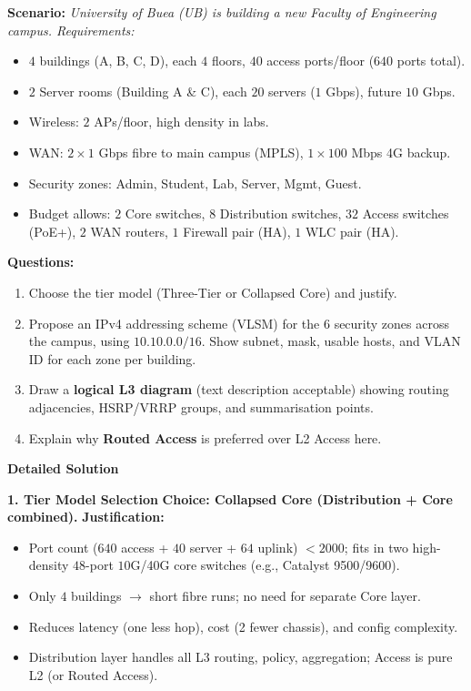 \documentclass[11pt]{article}
\begin{document}
\begin{exoresolu}
\textbf{Scenario:} \textit{University of Buea (UB) is building a new Faculty of Engineering campus. Requirements:}
\begin{itemize}
    \item $4$ buildings (A, B, C, D), each $4$ floors, $40$ access ports/floor ($640$ ports total).
    \item $2$ Server rooms (Building A \& C), each $20$ servers ($1$ Gbps), future $10$ Gbps.
    \item Wireless: $2$ APs/floor, high density in labs.
    \item WAN: $2 \times 1$ Gbps fibre to main campus (MPLS), $1 \times 100$ Mbps 4G backup.
    \item Security zones: Admin, Student, Lab, Server, Mgmt, Guest.
    \item Budget allows: $2$ Core switches, $8$ Distribution switches, $32$ Access switches (PoE+), $2$ WAN routers, $1$ Firewall pair (HA), $1$ WLC pair (HA).
\end{itemize}

\textbf{Questions:}
\begin{enumerate}
    \item Choose the tier model (Three-Tier or Collapsed Core) and justify.
    \item Propose an IPv4 addressing scheme (VLSM) for the $6$ security zones across the campus, using $10.10.0.0/16$. Show subnet, mask, usable hosts, and VLAN ID for each zone per building.
    \item Draw a \textbf{logical L3 diagram} (text description acceptable) showing routing adjacencies, HSRP/VRRP groups, and summarisation points.
    \item Explain why \textbf{Routed Access} is preferred over L2 Access here.
\end{enumerate}
\tcblower
\textbf{Detailed Solution}

\noindent\textbf{1. Tier Model Selection}
\textbf{Choice: Collapsed Core (Distribution + Core combined).}
\textbf{Justification:}
\begin{itemize}
    \item Port count ($640$ access + $40$ server + $64$ uplink) $< 2000$; fits in two high-density $48$-port $10$G/40G core switches (e.g., Catalyst 9500/9600).
    \item Only $4$ buildings $\rightarrow$ short fibre runs; no need for separate Core layer.
    \item Reduces latency (one less hop), cost (2 fewer chassis), and config complexity.
    \item Distribution layer handles all L3 routing, policy, aggregation; Access is pure L2 (or Routed Access).
\end{itemize}


\end{exoresolu}
\end{document}
